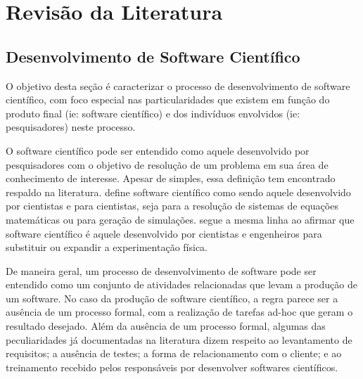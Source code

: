 \documentclass[
	article,			%
	11pt,				%
	oneside,			%
	a4paper,			%
	english,			%
	brazil,				%
	sumario=tradicional
	]{abntex2}
\begin{document}
\section*{Revisão da Literatura}

\subsection*{Desenvolvimento de Software Científico}
\label{subsec:scientific_software_development}
O objetivo desta seção é caracterizar o processo de desenvolvimento de software científico, com foco especial nas particularidades que existem em função do produto final (ie: software científico) e dos indivíduos envolvidos (ie: pesquisadores) neste processo.

O software científico pode ser entendido como aquele desenvolvido por pesquisadores com o objetivo de resolução de um problema em sua área de conhecimento de interesse. Apesar de simples, essa definição tem encontrado respaldo na literatura.  define software científico como sendo aquele desenvolvido por cientistas e para cientistas, seja para a resolução de sistemas de equações matemáticas ou para geração de simulações.  segue a mesma linha ao afirmar que software científico é aquele desenvolvido por cientistas e engenheiros para substituir ou expandir a experimentação física.

De maneira geral, um processo de desenvolvimento de software pode ser entendido como um conjunto de atividades relacionadas que levam a produção de um software. No caso da produção de software científico, a regra parece ser a ausência de um processo formal, com a realização de tarefas ad-hoc que geram o resultado desejado. Além da ausência de um processo formal, algumas das peculiaridades já documentadas na literatura dizem respeito ao levantamento de requisitos; a ausência de testes; a forma de relacionamento com o cliente; e ao treinamento recebido pelos responsáveis por desenvolver softwares científicos.
\end{document}
